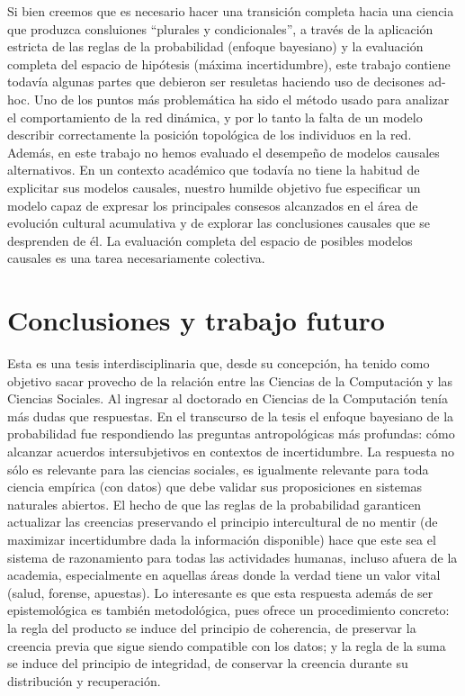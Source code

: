 \documentclass[a4paper,11pt]{book}
\theoremstyle{definition}
\begin{document}
Si bien creemos que es necesario hacer una transición completa hacia una ciencia que produzca consluiones ``plurales y condicionales'', a través de la aplicación estricta de las reglas de la probabilidad (enfoque bayesiano) y la evaluación completa del espacio de hipótesis (máxima incertidumbre), este trabajo contiene todavía algunas partes que debieron ser resuletas haciendo uso de decisones ad-hoc.
%
Uno de los puntos más problemática ha sido el método usado para analizar el comportamiento de la red dinámica, y por lo tanto la falta de un modelo describir correctamente la posición topológica de los individuos en la red.
%
Además, en este trabajo no hemos evaluado el desempeño de modelos causales alternativos.
%
En un contexto académico que todavía no tiene la habitud de explicitar sus modelos causales, nuestro humilde objetivo fue especificar un modelo capaz de expresar los principales consesos alcanzados en el área de evolución cultural acumulativa y de explorar las conclusiones causales que se desprenden de él.
%
La evaluación completa del espacio de posibles modelos causales es una tarea necesariamente colectiva.


\chapter{Conclusiones y trabajo futuro}

Esta es una tesis interdisciplinaria que, desde su concepción, ha tenido como objetivo sacar provecho de la relación entre las Ciencias de la Computación y las Ciencias Sociales.
%
Al ingresar al doctorado en Ciencias de la Computación tenía más dudas que respuestas.
%
En el transcurso de la tesis el enfoque bayesiano de la probabilidad fue respondiendo las preguntas antropológicas más profundas: cómo alcanzar acuerdos intersubjetivos en contextos de incertidumbre.
%
La respuesta no sólo es relevante para las ciencias sociales, es igualmente relevante para toda ciencia empírica (con datos) que debe validar sus proposiciones en sistemas naturales abiertos.
%
El hecho de que las reglas de la probabilidad garanticen actualizar las creencias preservando el principio intercultural de no mentir (de maximizar incertidumbre dada la información disponible) hace que este sea el sistema de razonamiento para todas las actividades humanas, incluso afuera de la academia, especialmente en aquellas áreas donde la verdad tiene un valor vital (salud, forense, apuestas).
%
Lo interesante es que esta respuesta además de ser epistemológica es también metodológica, pues ofrece un procedimiento concreto: la regla del producto se induce del principio de coherencia, de preservar la creencia previa que sigue siendo compatible con los datos; y la regla de la suma se induce del principio de integridad, de conservar la creencia durante su distribución y recuperación.
\end{document}
